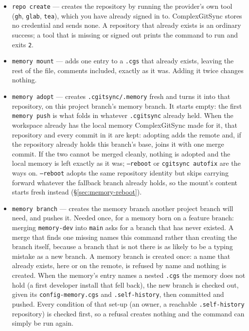 \begin{itemize}
  \item \texttt{repo create} --- creates the repository by running the
        provider's own tool (\texttt{gh}, \texttt{glab}, \texttt{tea}),
        which you have already signed in to. ComplexGitSync stores no
        credential and sends none. A repository that already exists is an
        ordinary success; a tool that is missing or signed out prints the
        command to run and exits \texttt{2}.
  \item \texttt{memory mount} --- adds one entry to a \texttt{.cgs} that
        already exists, leaving the rest of the file, comments included,
        exactly as it was. Adding it twice changes nothing.
  \item \texttt{memory adopt} --- creates \texttt{.cgitsync/.memory} fresh
        and turns it into that repository, on this project branch's memory
        branch. It starts empty: the first \texttt{memory push} is what
        folds in whatever \texttt{.cgitsync} already held. When the
        workspace already has the local memory ComplexGitSync made for it,
        that repository and every commit in it are kept: adopting adds the
        remote and, if the repository already holds this branch's base,
        joins it with one merge commit. If the two cannot be merged cleanly,
        nothing is adopted and the local memory is left exactly as it was;
        \texttt{--reboot} or \texttt{cgitsync autofix} are the ways on.
        \texttt{--reboot}
        adopts the same repository identity but skips carrying forward
        whatever the fallback branch already holds, so the mount's content
        starts fresh instead (\S\ref{sec:memory-reboot}).
  \item \texttt{memory branch} --- creates the memory branch another
        project branch will need, and pushes it. Needed once, for a memory
        born on a feature branch: merging \texttt{memory-dev} into
        \texttt{main} asks for a branch that has never existed. A merge
        that finds one missing names this command rather than creating the
        branch itself, because a branch that is not there is as likely to
        be a typing mistake as a new branch. A memory branch is created once:
        a name that already exists, here or on the remote, is refused by
        name and nothing is created. When the memory's entry names a nested
        \texttt{.cgs} the memory does not hold (a first developer install
        that fell back), the new branch is checked out, given its
        \texttt{config-memory.cgs} and \texttt{.self-history}, then committed
        and pushed. Every condition of that set-up (an owner, a reachable
        \texttt{.self-history} repository) is checked first, so a refusal
        creates nothing and the command can simply be run again.
\end{itemize}

